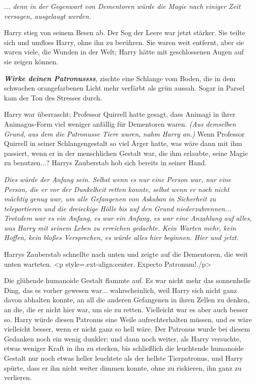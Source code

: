 \emph{... denn in der Gegenwart von Dementoren würde die Magie nach einiger Zeit versagen, ausgelaugt werden.}

Harry stieg von seinem Besen ab. Der Sog der Leere war jetzt stärker. Sie teilte
sich und umfloss Harry, ohne ihn zu berühren. Sie waren weit entfernt, aber sie
waren viele, die Wunden in der Welt; Harry hätte mit geschlossenen Augen auf sie
zeigen können.

\glqq \textbf{\emph{Wirke deinen Patronussss}}\grqq{}, zischte eine Schlange vom
Boden, die in dem schwachen orangefarbenen Licht mehr verfärbt als grün aussah.
Sogar in Parsel kam der Ton des Stresses durch.

Harry war überrascht; Professor Quirrell hatte gesagt, dass Animagi in ihrer
Animagus-Form viel weniger anfällig für Dementoren waren.\emph{ (Aus demselben
Grund, aus dem die Patronusse Tiere waren, nahm Harry an.)} Wenn Professor
Quirrell in seiner Schlangengestalt so viel Ärger hatte, was wäre dann mit ihm
passiert, wenn er in der menschlichen Gestalt war, die ihm erlaubte, seine Magie
zu benutzen...? Harrys Zauberstab hob sich bereits in seiner Hand.

\emph{Dies würde der Anfang sein. Selbst wenn es nur eine Person war, nur eine
Person, die er vor der Dunkelheit retten konnte, selbst wenn er noch nicht
mächtig genug war, um alle Gefangenen von Askaban in Sicherheit zu teleportieren
und die dreieckige Hölle bis auf den Grund niederzubrennen... Trotzdem war es
ein Anfang, }\emph{es war ein Anfang, es war eine Anzahlung auf alles, was Harry
mit seinem Leben zu erreichen gedachte. Kein Warten mehr, kein Hoffen, kein
bloßes Versprechen, es würde alles hier beginnen. Hier und jetzt.}

Harrys Zauberstab schnellte nach unten und zeigte auf die Dementoren, die weit
unten warteten. <p style=\grqq{}.ext-align:center\grqq{}. \glqq Expecto
Patronum!\grqq{}./p>

Die glühende humanoide Gestalt flammte auf. Es war nicht mehr das sonnenhelle
Ding, das es vorher gewesen war... wahrscheinlich, weil Harry sich nicht ganz
davon abhalten konnte, an all die anderen Gefangenen in ihren Zellen zu denken,
an die, die er nicht hier war, um sie zu retten. Vielleicht war es aber auch
besser so. Harry würde diesen Patronus eine Weile aufrechterhalten müssen, und
es wäre vielleicht besser, wenn er nicht ganz so hell wäre. Der Patronus wurde
bei diesem Gedanken noch ein wenig dunkler; und dann noch weiter, als Harry
versuchte, etwas weniger Kraft in ihn zu stecken, bis schließlich die leuchtende
humanoide Gestalt nur noch etwas heller leuchtete als der hellste Tierpatronus,
und Harry spürte, dass er ihn nicht weiter dimmen konnte, ohne zu riskieren, ihn
ganz zu verlieren.

